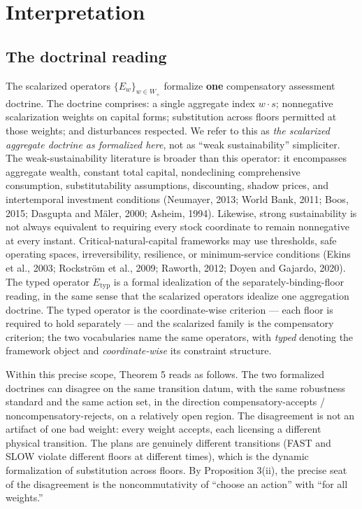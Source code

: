 \documentclass[3p,11pt]{elsarticle}
\begin{document}
\section{Interpretation}\label{interpretation}

\subsection{The doctrinal reading}\label{the-doctrinal-reading}

The scalarized operators \(\{E_w\}_{w \in W_+}\) formalize \textbf{one}
compensatory assessment doctrine. The doctrine comprises: a single
aggregate index \(w \cdot s\); nonnegative scalarization weights on
capital forms; substitution across floors permitted at those weights;
and disturbances respected. We refer to this as \emph{the scalarized
aggregate doctrine as formalized here}, not as ``weak sustainability''
simpliciter. The weak-sustainability literature is broader than this
operator: it encompasses aggregate wealth, constant total capital,
nondeclining comprehensive consumption, substitutability assumptions,
discounting, shadow prices, and intertemporal investment conditions
(Neumayer, 2013; World Bank, 2011; Boos, 2015; Dasgupta and M\"aler, 2000;
Asheim, 1994). Likewise, strong sustainability is not always equivalent
to requiring every stock coordinate to remain nonnegative at every
instant. Critical-natural-capital frameworks may use thresholds, safe
operating spaces, irreversibility, resilience, or minimum-service
conditions (Ekins et al., 2003; Rockstr\"om et al., 2009; Raworth, 2012;
Doyen and Gajardo, 2020). The typed
operator \(E_{\mathrm{typ}}\) is a formal idealization of the
separately-binding-floor reading, in the same sense that the scalarized
operators idealize one aggregation doctrine. The typed operator is the
coordinate-wise criterion --- each floor is required to hold separately ---
and the scalarized family is the compensatory criterion; the two vocabularies
name the same operators, with \emph{typed} denoting the framework object and
\emph{coordinate-wise} its constraint structure.

Within this precise scope, Theorem 5 reads as follows. The two
formalized doctrines can disagree on the same transition datum, with the
same robustness standard and the same action set, in the direction
compensatory-accepts / noncompensatory-rejects, on a relatively open
region. The disagreement is not an artifact of one bad weight: every
weight accepts, each licensing a different physical transition. The
plans are genuinely different transitions (FAST and SLOW violate
different floors at different times), which is the dynamic formalization
of substitution across floors. By Proposition 3(ii), the precise seat of
the disagreement is the noncommutativity of ``choose an action'' with
``for all weights.''
\end{document}
